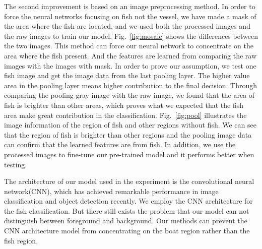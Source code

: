 \documentclass[conference]{IEEEtran}
\begin{document}


The second improvement is based on an image preprocessing method. In order to force the neural networks focusing on fish not the vessel, we have made a mask of the area where the fish are located, and we used both the processed images and the raw images to train our model. Fig.~\ref{fig:mosaic} shows the differences between the two images. This method can force our neural network to concentrate on the area where the fish present. And the features are learned from comparing the raw images with the images with mask. In order to prove our assumption, we test one fish image  and get the image data from the last pooling layer. The higher value area in the pooling layer means higher contribution to the final decision. Through comparing the pooling gray image with the raw image, we found that the area of fish is brighter than other areas, which proves what we expected that the fish area make great contribution in the classification. Fig.~\ref{fig:pool} illustrates the image information of the region of fish and other regions without fish. We can see that the region of fish is brighter than other regions and the pooling image data can confirm that the learned features are from fish. In addition, we use the processed images to fine-tune our pre-trained model and it performs better when testing.\par
The architecture of our model used in the experiment is the convolutional neural network(CNN), which has achieved remarkable performance in image classification and object detection recently. We employ the CNN architecture for the fish classification. But there still exists the problem that our model can not distinguish between foreground and background. Our methods can prevent the CNN architecture model from concentrating on the boat region rather than the fish region.
\end{document}
